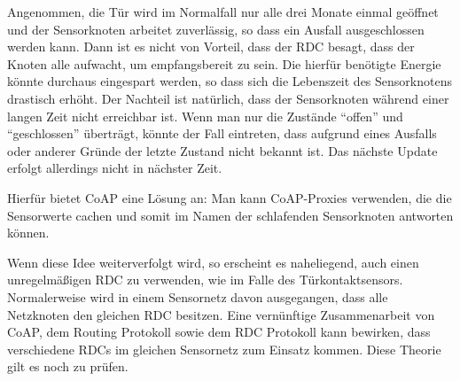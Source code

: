 	Angenommen, die Tür wird im Normalfall nur alle drei Monate einmal
	geöffnet und der Sensorknoten arbeitet zuverlässig, so dass ein Ausfall
	ausgeschlossen werden kann. Dann ist es nicht von Vorteil, dass der
	RDC besagt, dass der Knoten alle  aufwacht, um
	empfangsbereit zu sein. Die hierfür benötigte Energie könnte durchaus
	eingespart werden, so dass sich die Lebenszeit des Sensorknotens
	drastisch erhöht. Der Nachteil ist natürlich, dass der Sensorknoten
	während einer langen Zeit nicht erreichbar ist. Wenn man nur die
	Zustände \enquote{offen} und \enquote{geschlossen} überträgt, könnte
	der Fall eintreten, dass aufgrund eines Ausfalls oder anderer Gründe
	der letzte Zustand nicht bekannt ist. Das nächste Update erfolgt
	allerdings nicht in nächster Zeit.
	
	Hierfür bietet CoAP eine Lösung an: Man kann CoAP-Proxies verwenden,
	die die Sensorwerte cachen und somit im Namen der schlafenden
	Sensorknoten antworten können.

	Wenn diese Idee weiterverfolgt wird, so erscheint es naheliegend,
	auch einen unregelmäßigen RDC zu verwenden, wie im Falle
	des Türkontaktsensors. Normalerweise wird in einem Sensornetz davon
	ausgegangen, dass alle Netzknoten den gleichen RDC
	besitzen. Eine vernünftige Zusammenarbeit von CoAP, dem Routing
	Protokoll sowie dem RDC Protokoll kann bewirken,
	dass verschiedene RDCs im gleichen Sensornetz
	zum Einsatz kommen. Diese Theorie gilt es noch zu prüfen.

